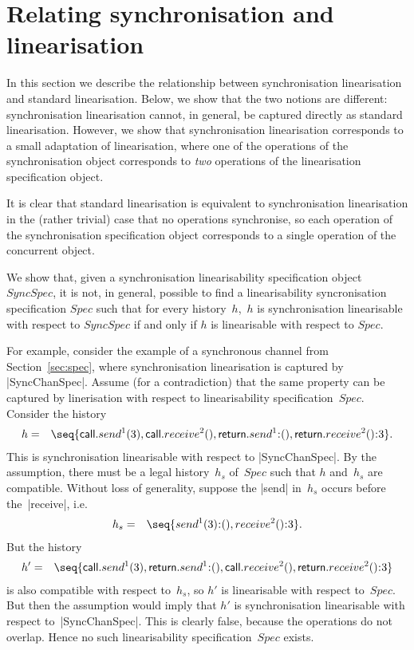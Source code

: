 \section{Relating synchronisation and linearisation}
\label{sec:relating}

In this section we describe the relationship between synchronisation
linearisation and standard linearisation.  Below, we show that the two notions
are different: synchronisation linearisation cannot, in general, be captured
directly as standard linearisation.  However, we show that synchronisation
linearisation corresponds to a small adaptation of linearisation, where one of
the operations of the synchronisation object corresponds to \emph{two}
operations of the linearisation specification object.

It is clear that standard linearisation is equivalent to synchronisation
linearisation in the (rather trivial) case that no operations synchronise, so
each operation of the synchronisation specification object corresponds to a
single operation of the concurrent object. 

We show that, given a synchronisation linearisability specification object
$SyncSpec$, it is not, in general, possible to find a linearisability
syncronisation specification $Spec$ such that for every history~$h$,\, $h$ is
synchronisation linearisable with respect to $SyncSpec$ if and only if $h$ is
linearisable with respect to $Spec$.

For example, consider the example of a synchronous channel from
Section~\ref{sec:spec}, where synchronisation linearisation is captured by
|SyncChanSpec|.  Assume (for a contradiction) that the same property can be
captured by linerisation with respect to linearisability specification~$Spec$.
Consider the history
\begin{eqnarray*}
h & = & \seq{ 
  \call.send^1(3), \call.receive^2(), 
  \return.send^1\::(), \return.receive^2()\::3 }.
\end{eqnarray*}
%
This is synchronisation linearisable with respect to |SyncChanSpec|.  By the
assumption, there must be a legal history~$h_s$ of~$Spec$ such that $h$
and~$h_s$ are compatible.  Without loss of generality, suppose the |send|
in~$h_s$ occurs before the~|receive|, i.e.
\begin{eqnarray*}
h_s & = & \seq{ send^1(3)\::(), receive^2()\::3 }.
\end{eqnarray*}
%
But the history
%
\begin{eqnarray*}
h' & = & \seq{ 
  \call.send^1(3), \return.send^1\::(), 
  \call.receive^2(), \return.receive^2()\::3 }
\end{eqnarray*}
%
is also compatible with respect to~$h_s$, so $h'$ is linearisable with respect
to~$Spec$.  But then the assumption would imply that $h'$ is synchronisation
linearisable with respect to~|SyncChanSpec|.  This is clearly false, because
the operations do not overlap.  Hence no such  linearisability
specification~$Spec$ exists.


